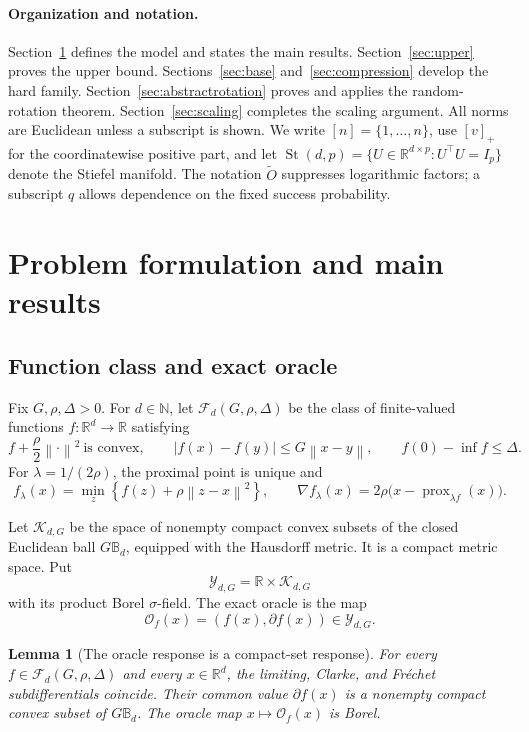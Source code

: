 \documentclass[11pt,a4paper]{article}
\newcommand{\R}{\mathbb{R}}
\newcommand{\N}{\mathbb{N}}
\newcommand{\norm}[1]{\left\lVert #1\right\rVert}
\newcommand{\abs}[1]{\left\lvert #1\right\rvert}
\newcommand{\cF}{\mathcal F}
\newcommand{\cO}{\mathcal O}
\newcommand{\cK}{\mathcal K}
\newcommand{\cY}{\mathcal Y}
\DeclareMathOperator{\prox}{prox}
\newtheorem{lemma}[theorem]{Lemma}
\theoremstyle{definition}
\numberwithin{equation}{section}
\newcommand{\St}{\operatorname{St}}
\begin{document}
\paragraph{Organization and notation.}
Section~\ref{sec:model} defines the model and states the main results.
Section~\ref{sec:upper} proves the upper bound.
Sections~\ref{sec:base} and~\ref{sec:compression} develop the hard family.
Section~\ref{sec:abstractrotation} proves and applies the random-rotation
theorem. Section~\ref{sec:scaling} completes the scaling argument.
All norms are Euclidean unless a subscript is shown. We write
$[n]=\{1,\ldots,n\}$, use $[v]_+$ for the coordinatewise positive part,
and let $\St(d,p)=\{U\in\R^{d\times p}:U^\top U=I_p\}$ denote the
Stiefel manifold. The notation $\widetilde O$ suppresses logarithmic factors;
a subscript $q$ allows dependence on the fixed success probability.

\section{Problem formulation and main results}\label{sec:model}

\subsection{Function class and exact oracle}

Fix $G,\rho,\Delta>0$. For $d\in\N$, let $\cF_d(G,\rho,\Delta)$ be the class of finite-valued functions $f:\R^d\to\R$ satisfying
\[
 f+\frac\rho2\norm{\cdot}^2\ \text{is convex},\qquad
 \abs{f(x)-f(y)}\le G\norm{x-y},\qquad
 f(0)-\inf f\le\Delta.
\]
For $\lambda=1/(2\rho)$, the proximal point is unique and
\[
 f_\lambda(x)=\min_z\left\{f(z)+\rho\norm{z-x}^2\right\},
 \qquad
 \nabla f_\lambda(x)=2\rho\bigl(x-\prox_{\lambda f}(x)\bigr).
\]

Let $\cK_{d,G}$ be the space of nonempty compact convex subsets of the closed Euclidean ball $G\mathbb B_d$, equipped with the Hausdorff metric.  It is a compact metric space.  Put
\[
 \cY_{d,G}=\R\times\cK_{d,G}
\]
with its product Borel $\sigma$-field.  The exact oracle is the map
\[
 \cO_f(x)=(f(x),\partial f(x))\in\cY_{d,G}.
\]

\begin{lemma}[The oracle response is a compact-set response]\label{lem:compactresponse}
For every $f\in\cF_d(G,\rho,\Delta)$ and every $x\in\R^d$, the limiting, Clarke, and Fr\'echet subdifferentials coincide.  Their common value $\partial f(x)$ is a nonempty compact convex subset of $G\mathbb B_d$. The oracle map $x\mapsto\cO_f(x)$ is Borel.
\end{lemma}
\end{document}
